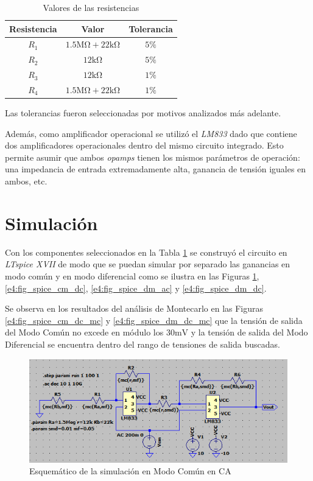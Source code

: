\begin{table}[ht]
\begin{center}
\begin{tabular}{||c|c|c||}
\hline
Resistencia	&	Valor &	Tolerancia\\
\hline	
$R_1$	&	$1.5\si{\mega\ohm} + 22\si{\kilo\ohm}$	&	$5\%$\\
$R_2$	&	$12\si{\kilo\ohm}$	&	$5\%$\\
$R_3$	&	$12\si{\kilo\ohm}$	&	$1\%$\\
$R_4$	&	$1.5\si{\mega\ohm} + 22\si{\kilo\ohm}$	&	$1\%$\\
\hline
\end{tabular}
\end{center}
\caption{Valores de las resistencias}
\label{e4:tab_res_vals}
\end{table}

Las tolerancias fueron seleccionadas por motivos analizados más adelante.

Además, como amplificador operacional se utilizó el \textit{LM833} dado que contiene dos amplificadores operacionales dentro del mismo circuito integrado. Esto permite asumir que ambos \textit{opamps} tienen los mismos parámetros de operación: una impedancia de entrada extremadamente alta, ganancia de tensión iguales en ambos, etc.

\newpage
\section{Simulación}

Con los componentes seleccionados en la Tabla \ref{e4:tab_res_vals} se construyó el circuito en \textit{LTspice XVII} de modo que se puedan simular por separado las ganancias en modo común y en modo diferencial como se ilustra en las Figuras \ref{e4:fig_spice_cm_ac}, \ref{e4:fig_spice_cm_dc}, \ref{e4:fig_spice_dm_ac} y \ref{e4:fig_spice_dm_dc}.

Se observa en los resultados del análisis de Montecarlo en las Figuras \ref{e4:fig_spice_cm_dc_mc} y \ref{e4:fig_spice_dm_dc_mc} que la tensión de salida del Modo Común no excede en módulo los $30 \si{\milli\volt}$ y la tensión de salida del Modo Diferencial se encuentra dentro del rango de tensiones de salida buscadas.

\begin{figure}[ht]
\begin{center}
\includegraphics[scale=1]{res/spice/spice_cm_ac_sch.png}
\caption{Esquemático de la simulación en Modo Común en CA}
\label{e4:fig_spice_cm_ac}
\end{center}
\end{figure}

